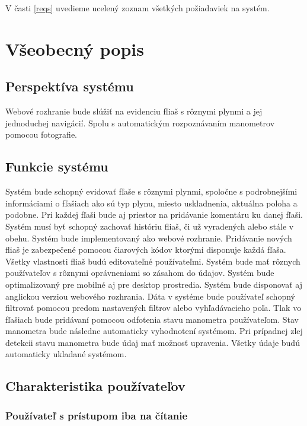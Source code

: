 \documentclass[hreffootnote]{zah}
\begin{document}
V časti \ref{reqs} uvedieme ucelený zoznam všetkých požiadaviek na systém.

\cleardoublepage
\section{Všeobecný popis}
\label{general}

\subsection{Perspektíva systému}
\label{gen:perspective}
Webové rozhranie bude slúžiť na evidenciu fľiaš s rôznymi plynmi a jej jednoduchej navigácií. Spolu s automatickým rozpoznávaním manometrov pomocou fotografie.

\subsection{Funkcie systému}
\label{gen:functions}
Systém bude schopný evidovať fľaše s rôznymi plynmi, spoločne s podrobnejšími informáciami o fľašiach ako sú typ plynu, miesto uskladnenia, aktuálna poloha a podobne. Pri každej fľaši bude aj priestor na pridávanie komentáru ku danej fľaši. Systém musí byť schopný zachovať históriu fliaš, či už vyradených alebo stále v obehu. Systém bude implementovaný ako webové rozhranie. Pridávanie nových fliaš je zabezpečené pomocou čiarových kódov ktorými disponuje každá fľaša. Všetky vlastnosti fliaš budú editovateľné používateľmi. Systém bude mať rôznych používateľov s rôznymi oprávneniami so zásahom do údajov. Systém bude optimalizovaný pre mobilné aj pre desktop prostredia. Systém bude disponovať aj anglickou verziou webového rozhrania. Dáta v systéme bude používateľ schopný filtrovať pomocou predom nastavených filtrov alebo vyhľadávacieho poľa. Tlak vo fľašiach bude pridávaní pomocou odfotenia stavu manometra používateľom. Stav manometra bude následne automaticky vyhodnotení systémom. Pri prípadnej zlej detekcii stavu manometra bude údaj mať možnosť upravenia. Všetky údaje budú automaticky ukladané systémom.

\subsection{Charakteristika používateľov}
\label{gen:users}

\subsubsection{Používateľ s prístupom iba na čítanie}
\label{gen:users:ro}
\end{document}
